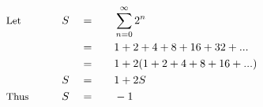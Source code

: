 \begin{alignat*}{5}
&\small\text{Let}&S\quad&=\quad&&\sum_{n=0}^\infty 2^n\\
&\,&\,&=&&1+2+4+8+16+32+...\\
&\,&\,&=&&1+2(1+2+4+8+16+...)\\
&\,&S\quad&=&&1+2S\\
&\small\text{Thus}\normalsize\qquad&S\quad&=&&-1
\end{alignat*}
